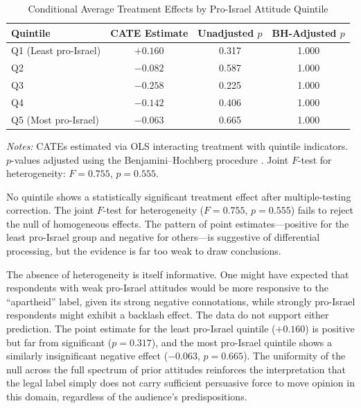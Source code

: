 \documentclass[12pt]{article}
\begin{document}
\begin{table}[H]
\centering
\begin{threeparttable}
\caption{Conditional Average Treatment Effects by Pro-Israel Attitude Quintile}
\label{tab:cate}
\begin{tabular}{lccc}
\toprule
Quintile & CATE Estimate & Unadjusted $p$ & BH-Adjusted $p$ \\
\midrule
Q1 (Least pro-Israel) & $+0.160$ & 0.317 & 1.000 \\
Q2                     & $-0.082$ & 0.587 & 1.000 \\
Q3                     & $-0.258$ & 0.225 & 1.000 \\
Q4                     & $-0.142$ & 0.406 & 1.000 \\
Q5 (Most pro-Israel)   & $-0.063$ & 0.665 & 1.000 \\
\bottomrule
\end{tabular}
\begin{tablenotes}
\small
\item \textit{Notes:} CATEs estimated via OLS interacting treatment with quintile indicators. $p$-values adjusted using the Benjamini--Hochberg procedure \citep{benjamini1995controlling}. Joint $F$-test for heterogeneity: $F = 0.755$, $p = 0.555$.
\end{tablenotes}
\end{threeparttable}
\end{table}

No quintile shows a statistically significant treatment effect after multiple-testing correction. The joint $F$-test for heterogeneity ($F = 0.755$, $p = 0.555$) fails to reject the null of homogeneous effects. The pattern of point estimates---positive for the least pro-Israel group and negative for others---is suggestive of differential processing, but the evidence is far too weak to draw conclusions.

The absence of heterogeneity is itself informative. One might have expected that respondents with weak pro-Israel attitudes would be more responsive to the ``apartheid'' label, given its strong negative connotations, while strongly pro-Israel respondents might exhibit a backlash effect. The data do not support either prediction. The point estimate for the least pro-Israel quintile ($+0.160$) is positive but far from significant ($p = 0.317$), and the most pro-Israel quintile shows a similarly insignificant negative effect ($-0.063$, $p = 0.665$). The uniformity of the null across the full spectrum of prior attitudes reinforces the interpretation that the legal label simply does not carry sufficient persuasive force to move opinion in this domain, regardless of the audience's predispositions.
\end{document}
